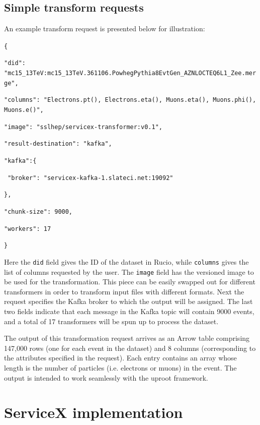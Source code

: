 \documentclass{webofc}
\begin{document}
\subsection{Simple transform requests}
\label{subsec:requests}

An example transform request is presented below for illustration:

\bigskip

{\raggedright \footnotesize
  \texttt{\{}
  
  \texttt{"did": "mc15\_13TeV:mc15\_13TeV.361106.PowhegPythia8EvtGen\_AZNLOCTEQ6L1\_Zee.merge",}
  
  \texttt{"columns": "Electrons.pt(), Electrons.eta(), Muons.eta(), Muons.phi(), Muons.e()",}
  
  \texttt{"image": "sslhep/servicex-transformer:v0.1",}
  
  \texttt{"result-destination": "kafka",}
  
  \texttt{"kafka":\{}
  
  \texttt{    "broker": "servicex-kafka-1.slateci.net:19092"}
  
  \texttt{\},}
  
  \texttt{"chunk-size": 9000,}
  
  \texttt{"workers": 17}
  
  \texttt{\}}
}

\bigskip

Here the \texttt{did} field gives the ID of the dataset in Rucio, while \texttt{columns} gives the
list of columns requested by the user. The \texttt{image} field has the versioned image to be used
for the transformation. This piece can be easily swapped out for different transformers in order to
transform input files with different formats. Next the request specifies the Kafka broker to which
the output will be assigned. The last two fields indicate that each message in the Kafka topic will
contain 9000 events, and a total of 17 transformers will be spun up to process the dataset.

The output of this transformation request arrives as an Arrow table comprising 147,000 rows (one
for each event in the dataset) and 8 columns (corresponding to the attributes specified in the
request). Each entry contains an array whose length is the number of particles (i.e. electrons or
muons) in the event. The output is intended to work seamlessly with the uproot framework.

\section{ServiceX implementation}
\label{sec:implement}
\end{document}
